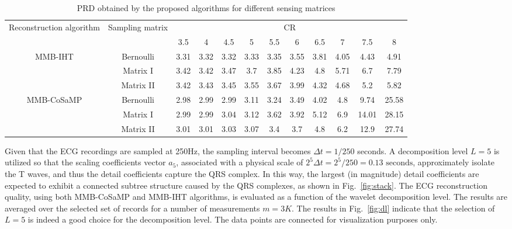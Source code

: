 \documentclass[journal]{IEEEtran}
\begin{document}
\begin{table*}[t]
\footnotesize
\renewcommand{\arraystretch}{1.3}
\caption{PRD obtained by the proposed algorithms for different sensing matrices}
\label{table_example}
\centering
\begin{tabular*}{0.8\textwidth}{@{\extracolsep\fill}c|c|cccccccccc}
\hline
\multirow{2}{1.5cm}{Reconstruction algorithm}&\multirow{2}{1.5cm}{Sampling matrix}&\multicolumn{10}{c}{CR}\\
\cline{3-12}
&&3.5&4&4.5&5&5.5&6&6.5&7&7.5&8\\
\hline
\multirow{3}{1.5cm}{MMB-IHT}& Bernoulli  &3.31&3.32&3.32&3.33&3.35&3.55&3.81&4.05&4.43&4.91\\
&Matrix I &  3.42&3.42&3.47&3.7&3.85&4.23&4.8& 5.71&6.7&7.79\\
&Matrix II & 3.42&3.43&3.45&3.55&3.67&3.99&4.32&4.68&5.2 & 5.82\\
\hline
\multirow{3}{1.5cm}{MMB-CoSaMP}&Bernoulli & 2.98&2.99&2.99&3.11&3.24&3.49&4.02&4.8&9.74&25.58\\
&Matrix I &  2.99&2.99&3.04&3.12&3.62&3.92&5.12&6.9&14.01&28.15\\
&Matrix II & 3.01&3.01&3.03&3.07&3.4&3.7&4.8&6.2& 12.9&27.74\\
\hline
\end{tabular*}
\end{table*}

Given that the ECG recordings are sampled at 250Hz, the sampling interval becomes $\Delta t=1/250$ seconds. A decomposition level $L=5$ is utilized so that the scaling coefficients vector $a_5$, associated with a physical scale of $2^5\Delta t=2^5/250=0.13 \text{ seconds}$, approximately isolate the T waves, and thus the detail coefficients capture the QRS complex. In this way, the largest (in magnitude) detail coefficients are expected to exhibit a connected subtree structure caused by the QRS complexes, as shown in Fig.~\ref{fig:stack}. The ECG reconstruction quality, using both MMB-CoSaMP and MMB-IHT algorithms, is evaluated as a function of the wavelet decomposition level. The results are averaged over the selected set of records for a number of measurements $m=3K$. The results in Fig.~\ref{fig:dl} indicate that the selection of $L=5$ is indeed a good choice for the decomposition level. The data points are connected for visualization purposes only.
\end{document}
